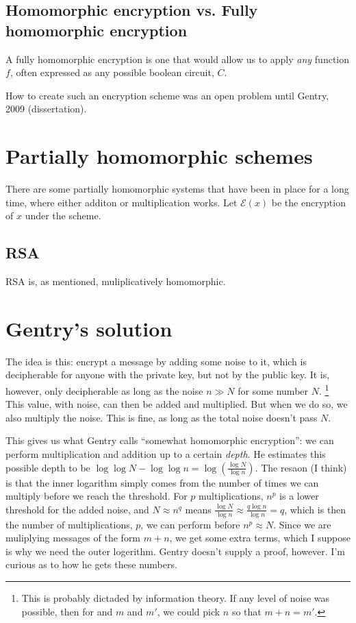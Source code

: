 \documentclass{article}
\begin{document}
\subsection{Homomorphic encryption vs. Fully homomorphic encryption}

A fully homomorphic encryption is one that would allow us to apply \textit{any} function $f$, often expressed as any possible boolean circuit, $C$.

How to create such an encryption scheme was an open problem until Gentry, 2009 (dissertation).

\section{Partially homomorphic schemes}

There are some partially homomorphic systems that have been in place for a long time, where either additon or multiplication works. Let $\mathcal{E}(x)$ be the encryption of $x$ under the scheme.

\subsection{RSA}
RSA is, as mentioned, muliplicatively homomorphic.


\section{Gentry's solution}

The idea is this: encrypt a message by adding some noise to it, which is decipherable for anyone with the private key, but not by the public key. It is, however, only decipherable as long as the noise $n \gg N$ for some number $N$. \footnote{This is probably dictaded by information theory. If any level of noise was possible, then for and $m$ and $m'$, we could pick $n$ so that $m + n = m'$.} This value, with noise, can then be added and multiplied. But when we do so, we also multiply the noise. This is fine, as long as the total noise doesn't pass $N$.

This gives us what Gentry calls ``somewhat homomorphic encryption'': we can perform multiplication and addition up to a certain \textit{depth}. He estimates this possible depth to be $\log \log N - \log \log n = \log (\frac{\log N}{\log n})$. The resaon (I think) is that the inner logarithm simply comes from the number of times we can multiply before we reach the threshold. For $p$ multiplications, $n^p$ is a lower threshold for the added noise, and $N \approx n^q$ means $\frac{\log N}{\log n} \approx \frac{q \log n}{\log n} = q$, which is then the number of multiplications, $p$, we can perform before $n^p \approx N$. Since we are muliplying messages of the form $m+n$, we get some extra terms, which I suppose is why we need the outer logerithm. Gentry doesn't supply a proof, however. I'm curious as to how he gets these numbers.
\end{document}
